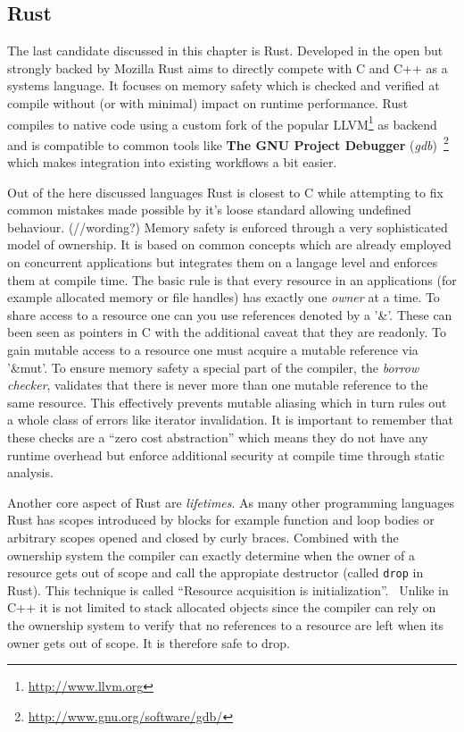\subsection*{Rust}
\label{subsec:State_of_the_art::Candidates::Rust}

The last candidate discussed in this chapter is Rust. Developed in the open but strongly backed by Mozilla Rust aims to directly compete with C and C++ as a systems language. It focuses on memory safety which is checked and verified at compile without (or with minimal) impact on runtime performance. Rust compiles to native code using a custom fork of the popular LLVM\footnote{\url{http://www.llvm.org}} as backend and is compatible to common tools like \textbf{The GNU Project Debugger} (\textit{gdb})~\footnote{\url{http://www.gnu.org/software/gdb/}} which makes integration into existing workflows a bit easier.

Out of the here discussed languages Rust is closest to C while attempting to fix common mistakes made possible by it's loose standard allowing undefined behaviour. (//wording?) Memory safety is enforced through a very sophisticated model of ownership. It is based on common concepts which are already employed on concurrent applications but integrates them on a langage level and enforces them at compile time. The basic rule is that every resource in an applications (for example allocated memory or file handles) has exactly one \textit{owner} at a time. To share access to a resource one can you use references denoted by a '\&'. These can been seen as pointers in C with the additional caveat that they are readonly. To gain mutable access to a resource one must acquire a mutable reference via '\&mut'. To ensure memory safety a special part of the compiler, the \textit{borrow checker}, validates that there is never more than one mutable reference to the same resource. This effectively prevents mutable aliasing which in turn rules out a whole class of errors like iterator invalidation. It is important to remember that these checks are a ``zero cost abstraction'' which means they do not have any runtime overhead but enforce additional security at compile time through static analysis.

Another core aspect of Rust are \textit{lifetimes}. As many other programming languages Rust has scopes introduced by blocks for example function and loop bodies or arbitrary scopes opened and closed by curly braces. Combined with the ownership system the compiler can exactly determine when the owner of a resource gets out of scope and call the appropiate destructor (called \lstinline$drop$ in Rust). This technique is called ``Resource acquisition is initialization''.~\cite[p. 389]{evolution_c++} Unlike in C++ it is not limited to stack allocated objects since the compiler can rely on the ownership system to verify that no references to a resource are left when its owner gets out of scope. It is therefore safe to drop.
\\


